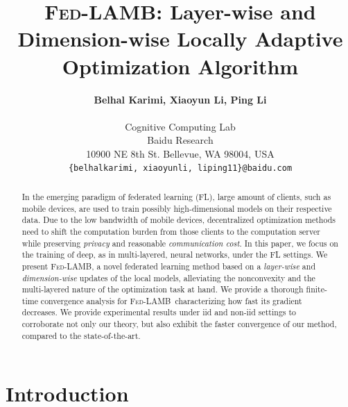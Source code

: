 \documentclass[11pt]{article}
\newcommand{\algo}{\textsc{Fed-LAMB}}
\begin{document}
\title{\bf \textsc{Fed-LAMB}: Layer-wise and Dimension-wise Locally Adaptive Optimization Algorithm}


\author{\textbf{Belhal Karimi, Xiaoyun Li, Ping Li}\\\\
Cognitive Computing Lab\\
Baidu Research\\
10900 NE 8th St. Bellevue, WA 98004, USA\\
\texttt{\{belhalkarimi, xiaoyunli, liping11\}@baidu.com}
}

\date{\vspace{0.5in}}

\maketitle

\begin{abstract}\vspace{0.1in}
\noindent In the emerging paradigm of federated learning (FL), large amount of clients, such as mobile devices, are used to train possibly high-dimensional models on their respective data.
Due to the low bandwidth of mobile devices, decentralized optimization methods need to shift the computation burden from those clients to the computation server while preserving \emph{privacy} and reasonable \emph{communication cost}.
In this paper, we focus on the training of deep, as in multi-layered, neural networks, under the FL settings.
We present \algo, a novel federated learning method based on a \emph{layer-wise} and \emph{dimension-wise} updates of the local models, alleviating the nonconvexity and the multi-layered nature of the optimization task at hand.
We provide a thorough finite-time convergence analysis for \algo\ characterizing how fast its gradient decreases. We provide experimental results under iid and non-iid settings to corroborate not only our theory, but also exhibit the faster convergence of our method, compared to the state-of-the-art.
\end{abstract}


\newpage


\section{Introduction}\label{sec:introduction}
\end{document}
